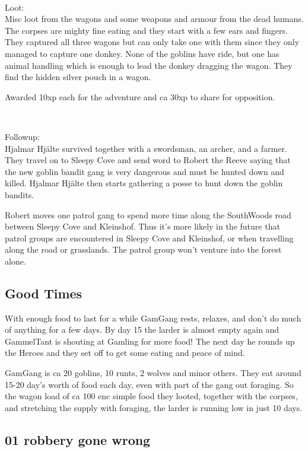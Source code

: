 \

Loot: \\
Misc loot from the wagons and some weapons and armour from the dead humans. The corpses are mighty fine eating and they start with a few ears and fingers.
They captured all three wagons but can only take one with them since they only managed to capture one donkey. None of the goblins have ride, but one has animal handling which is enough to lead the donkey dragging the wagon. They find the hidden silver pouch in a wagon.

Awarded 10xp each for the adventure and ca 30xp to share for opposition.

\

Followup: \\
Hjalmar Hjälte survived together with a swordsman, an archer, and a farmer. They travel on to Sleepy Cove and send word to Robert the Reeve saying that the new goblin bandit gang is very dangerous and must be hunted down and killed. Hjalmar Hjälte then starts gathering a posse to hunt down the goblin bandits.

Robert moves one patrol gang to spend more time along the SouthWoods road between Sleepy Cove and Kleinshof. Thus it's more likely in the future that patrol groups are encountered in Sleepy Cove and Kleinshof, or when travelling along the road or grasslands. The patrol group won't venture into the forest alone.


\subsection*{Good Times}

With enough food to last for a while GamGang rests, relaxes, and don't do much of anything for a few days. By day 15 the larder is almost empty again and GammelTant is shouting at Gamling for more food! The next day he rounds up the Heroes and they set off to get some eating and peace of mind.

GamGang is ca 20 goblins, 10 runts, 2 wolves and minor others. They eat around 15-20 day's worth of food each day, even with part of the gang out foraging. So the wagon load of ca 100 enc simple food they looted, together with the corpses, and stretching the supply with foraging, the larder is running low in just 10 days.


\subsection*{01 robbery gone wrong}

